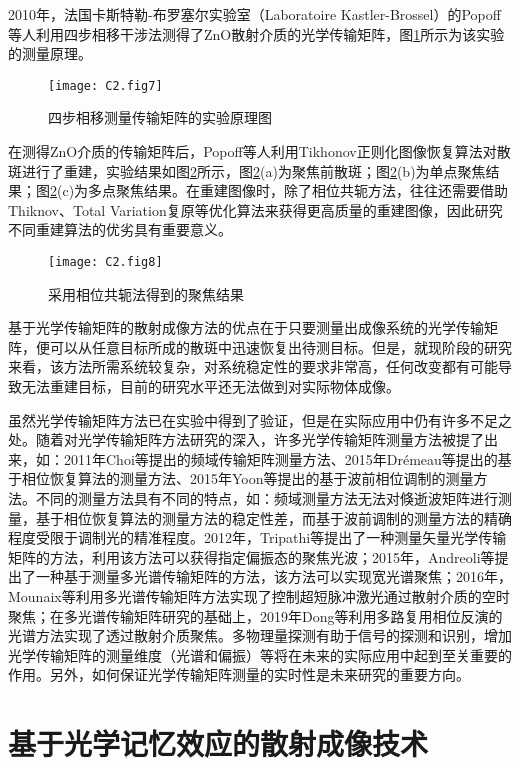 2010年，法国卡斯特勒-布罗塞尔实验室（Laboratoire Kastler-Brossel）的Popoff等人利用四步相移干涉法测得了ZnO散射介质的光学传输矩阵，图\ref{fig2:7}所示为该实验的测量原理。

\begin{figure}[htp]
	\centering
	\texttt{[image: C2.fig7]}
	\caption{四步相移测量传输矩阵的实验原理图}
	\label{fig2:7}
\end{figure}

在测得ZnO介质的传输矩阵后，Popoff等人利用Tikhonov正则化图像恢复算法对散斑进行了重建，实验结果如图\ref{fig2:8}所示，图\ref{fig2:8}(a)为聚焦前散斑；图\ref{fig2:8}(b)为单点聚焦结果；图\ref{fig2:8}(c)为多点聚焦结果。在重建图像时，除了相位共轭方法，往往还需要借助Thiknov、Total Variation复原等优化算法来获得更高质量的重建图像，因此研究不同重建算法的优劣具有重要意义。

\begin{figure}[htp]
	\centering
	\texttt{[image: C2.fig8]}
	\caption{采用相位共轭法得到的聚焦结果}
	\label{fig2:8}
\end{figure}

基于光学传输矩阵的散射成像方法的优点在于只要测量出成像系统的光学传输矩阵，便可以从任意目标所成的散斑中迅速恢复出待测目标。但是，就现阶段的研究来看，该方法所需系统较复杂，对系统稳定性的要求非常高，任何改变都有可能导致无法重建目标，目前的研究水平还无法做到对实际物体成像。

虽然光学传输矩阵方法已在实验中得到了验证，但是在实际应用中仍有许多不足之处。随着对光学传输矩阵方法研究的深入，许多光学传输矩阵测量方法被提了出来，如：2011年Choi等提出的频域传输矩阵测量方法、2015年Drémeau等提出的基于相位恢复算法的测量方法、2015年Yoon等提出的基于波前相位调制的测量方法。不同的测量方法具有不同的特点，如：频域测量方法无法对倏逝波矩阵进行测量，基于相位恢复算法的测量方法的稳定性差，而基于波前调制的测量方法的精确程度受限于调制光的精准程度。2012年，Tripathi等提出了一种测量矢量光学传输矩阵的方法，利用该方法可以获得指定偏振态的聚焦光波；2015年，Andreoli等提出了一种基于测量多光谱传输矩阵的方法，该方法可以实现宽光谱聚焦；2016年，Mounaix等利用多光谱传输矩阵方法实现了控制超短脉冲激光通过散射介质的空时聚焦；在多光谱传输矩阵研究的基础上，2019年Dong等利用多路复用相位反演的光谱方法实现了透过散射介质聚焦。多物理量探测有助于信号的探测和识别，增加光学传输矩阵的测量维度（光谱和偏振）等将在未来的实际应用中起到至关重要的作用。另外，如何保证光学传输矩阵测量的实时性是未来研究的重要方向。

\section{基于光学记忆效应的散射成像技术}

